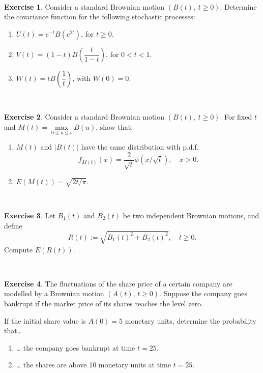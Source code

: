 \documentclass[
  11pt,
  a4paper,
]{book}
\theoremstyle{definition}
\theoremstyle{definition}
\theoremstyle{definition}
\newtheorem{exercise}{Exercise}[chapter]
\theoremstyle{definition}
\theoremstyle{remark}
\begin{document}
\(\,\)

\begin{exercise}
\leavevmode

Consider a standard Brownian motion \((B(t),~t\geq 0)\). Determine the covariance function for the following stochastic processes:

\begin{enumerate}
\def\labelenumi{(\alph{enumi})}
\item
  \(U(t)=e^{-t}B(e^{2t})\), for \(t\geq 0\).
\item
  \(V(t)=(1-t)B\!\left(\dfrac{t}{1-t}\right)\), for \(0<t<1\).
\item
  \(W(t)=tB\!\left(\dfrac{1}{t}\right)\), with \(W(0)=0\).
\end{enumerate}

\end{exercise}

\(\,\)

\begin{exercise}
\leavevmode

Consider a standard Brownian motion \((B(t),~t \geq 0)\). For fixed \(t\) and \(M(t)=\max\limits_{0\leq u\leq t}B(u)\), show that:

\begin{enumerate}
\def\labelenumi{(\alph{enumi})}
\item
  \(M(t)\) and \(\left| B(t)\right|\) have the same distribution with p.d.f.
  \[
  f_{M(t)}(x)=\frac{2}{\sqrt{t}}\phi (x/\sqrt{t}), \quad x>0.
  \]
\item
  \(E(M(t))=\sqrt{2t/\pi }\).
\end{enumerate}

\end{exercise}

\(\,\)

\begin{exercise}
\leavevmode

Let \(B_{1}(t)\) and \(B_{2}(t)\) be two independent Brownian motions, and define \[R(t):=\sqrt{B_{1}(t)^{2}+B_{2}(t)^{2}}, \quad t\geq 0.\]
Compute \(E(R(t))\).

\end{exercise}

\(\,\)

\begin{exercise}
\leavevmode

The fluctuations of the share price of a certain company are modelled by a Brownian motion \((A(t),\, t \geq 0)\). Suppose the company goes bankrupt if the market price of its shares reaches the level zero.

If the initial share value is \(A(0) = 5\) monetary units, determine the probability that\ldots{}

\begin{enumerate}
\def\labelenumi{(\alph{enumi})}
\item
  \ldots{} the company goes bankrupt at time \(t = 25\).
\item
  \ldots{} the shares are above 10 monetary units at time \(t = 25\).
\end{enumerate}

\end{exercise}
\end{document}
